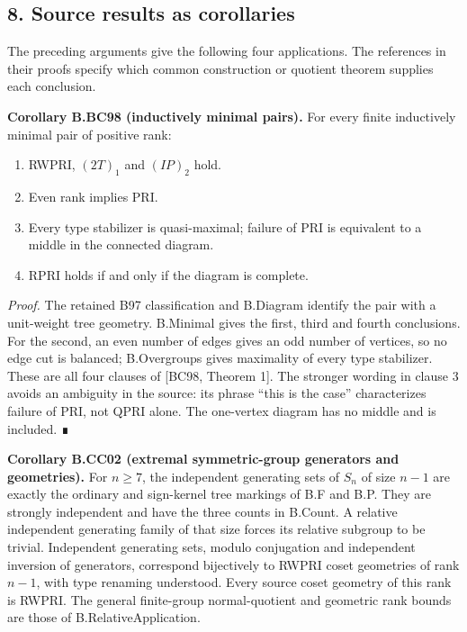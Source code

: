 \documentclass[
  11pt,
  a4paper,
]{article}
\providecommand{\tightlist}{%
  \setlength{\itemsep}{0pt}\setlength{\parskip}{0pt}}
\begin{document}
\subsection{8. Source results as
corollaries}\label{source-results-as-corollaries}

The preceding arguments give the following four applications. The
references in their proofs specify which common construction or quotient
theorem supplies each conclusion.

\textbf{Corollary B.BC98 (inductively minimal pairs).} For every finite
inductively minimal pair of positive rank:

\begin{enumerate}
\def\labelenumi{\arabic{enumi}.}
\tightlist
\item
  RWPRI, \((2T)_1\) and \((IP)_2\) hold.
\item
  Even rank implies PRI.
\item
  Every type stabilizer is quasi-maximal; failure of PRI is equivalent
  to a middle in the connected diagram.
\item
  RPRI holds if and only if the diagram is complete.
\end{enumerate}

\emph{Proof.} The retained B97 classification and B.Diagram identify the
pair with a unit-weight tree geometry. B.Minimal gives the first, third
and fourth conclusions. For the second, an even number of edges gives an
odd number of vertices, so no edge cut is balanced; B.Overgroups gives
maximality of every type stabilizer. These are all four clauses of
{[}BC98, Theorem 1{]}. The stronger wording in clause 3 avoids an
ambiguity in the source: its phrase ``this is the case'' characterizes
failure of PRI, not QPRI alone. The one-vertex diagram has no middle and
is included. ∎

\textbf{Corollary B.CC02 (extremal symmetric-group generators and
geometries).} For \(n\geq7\), the independent generating sets of \(S_n\)
of size \(n-1\) are exactly the ordinary and sign-kernel tree markings
of B.F and B.P. They are strongly independent and have the three counts
in B.Count. A relative independent generating family of that size forces
its relative subgroup to be trivial. Independent generating sets, modulo
conjugation and independent inversion of generators, correspond
bijectively to RWPRI coset geometries of rank \(n-1\), with type
renaming understood. Every source coset geometry of this rank is RWPRI.
The general finite-group normal-quotient and geometric rank bounds are
those of B.RelativeApplication.
\end{document}
